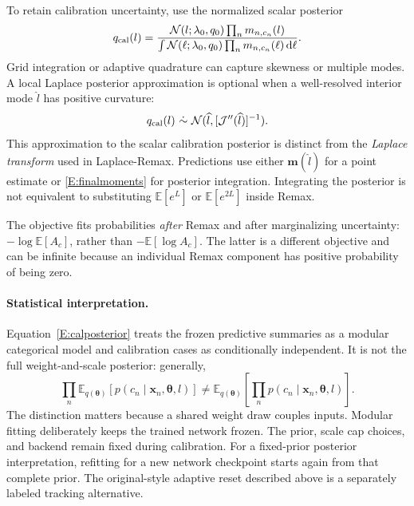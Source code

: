 \documentclass[letterpaper]{article}
\newcommand{\E}{\mathbb E}
\newcommand{\Normal}{\mathcal N}
\newcommand{\dd}{\,\mathrm d}
\newcommand{\given}{\mid}
\begin{document}
To retain calibration uncertainty, use the normalized scalar posterior
\begin{equation}
q_{\rm cal}(l)=\frac{\Normal(l;\lambda_0,q_0)\prod_n m_{n,c_n}(l)}
{\int\Normal(\ell;\lambda_0,q_0)\prod_n m_{n,c_n}(\ell)\dd\ell}.
\label{E:calposterior}
\end{equation}
Grid integration or adaptive quadrature can capture skewness or multiple modes. A local Laplace posterior approximation is optional when a well-resolved interior mode $\widehat l$ has positive curvature:
\begin{equation}
q_{\rm cal}(l)\ \dot\sim\ \Normal(\widehat l,[\mathcal J''(\widehat l)]^{-1}).
\end{equation}
This approximation to the scalar calibration posterior is distinct from the \emph{Laplace transform} used in Laplace-Remax. Predictions use either $\bm m(\widehat l)$ for a point estimate or \eqref{E:finalmoments} for posterior integration. Integrating the posterior is not equivalent to substituting $\E[e^L]$ or $\E[e^{2L}]$ inside Remax.

The objective fits probabilities \emph{after} Remax and after marginalizing uncertainty: $-\log\E[A_c]$, rather than $-\E[\log A_c]$. The latter is a different objective and can be infinite because an individual Remax component has positive probability of being zero.

\paragraph{Statistical interpretation.}
Equation~\eqref{E:calposterior} treats the frozen predictive summaries as a modular categorical model and calibration cases as conditionally independent. It is not the full weight-and-scale posterior: generally,
\begin{equation}
\prod_n\E_{q(\bm\theta)}[p(c_n\given\bm x_n,\bm\theta,l)]
\ne \E_{q(\bm\theta)}\!\left[\prod_n p(c_n\given\bm x_n,\bm\theta,l)\right].
\end{equation}
The distinction matters because a shared weight draw couples inputs. Modular fitting deliberately keeps the trained network frozen. The prior, scale cap choices, and backend remain fixed during calibration. For a fixed-prior posterior interpretation, refitting for a new network checkpoint starts again from that complete prior. The original-style adaptive reset described above is a separately labeled tracking alternative.
\end{document}
